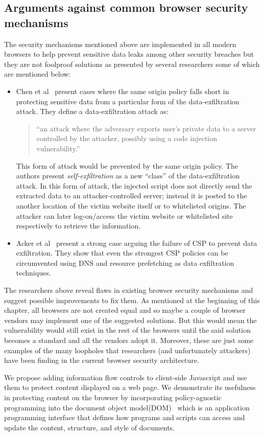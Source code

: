 \subsection{Arguments against common browser security mechanisms \label{sec:against}}
The security mechanisms mentioned above are implemented in all modern browsers to
help prevent sensitive data leaks among other security breaches but they are not
foolproof solutions as presented by several researchers some of which are mentioned
below:
\begin{itemize}
  \item Chen et al~\cite{SelfExfil} present cases where the same origin policy falls short
  in protecting sensitive data from a particular form of the data-exfiltration attack.
  They define a data-exfiltration attack as:

  \begin{quotation}
    ``an attack where the adversary exports user's private data to a server controlled
    by the attacker, possibly using a code injection vulnerability.''
  \end{quotation}
  This form of attack would be prevented by the same origin policy. The authors present
  \textit{self-exfiltration} as a new ``class'' of the data-exfiltration attack. In
  this form of attack, the injected script does not directly send the extracted data
  to an attacker-controlled server; instead it is posted to the another location
  of the victim website itself or to whitelisted origins. The attacker can later
  log-on/access the victim website or whitelisted site respectively to retrieve the
  information.

  \item Acker et al~\cite{DataExfilCSP} present a strong case arguing the failure of
  CSP to prevent data exfiltration. They show that even the strongest CSP policies
  can be circumvented using DNS and resource prefetching as data exfiltration
  techniques.
\end{itemize}
The researchers above reveal flaws in existing browser security mechanisms and suggest
possible improvements to fix them. As mentioned at the beginning of this chapter,
all browsers are not created equal and so maybe a couple of browser vendors may
implement one of the suggested solutions. But this would mean the vulnerability
would still exist in the rest of the browsers until the said solution becomes a
standard and all the vendors adopt it. Moreover, these are just some examples of
the many loopholes that researchers (and unfortunately attackers) have been finding
in the current browser security architecture.

We propose adding information flow controls to client-side Javascript and use them
to protect content displayed on a web page. We demonstrate its usefulness in
protecting content on the browser by incorporating policy-agnostic programming into
the document object model(DOM)~\cite{DOM} which is an application programming
interface that defines how programs and scripts can access and update the content,
structure, and style of documents.

